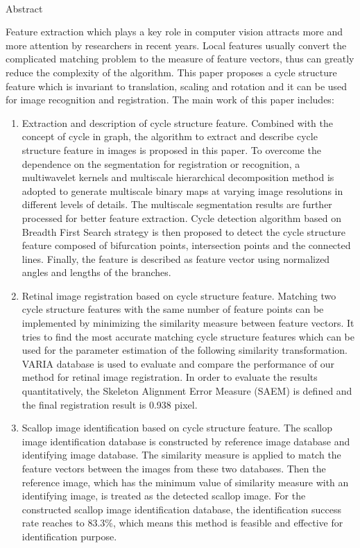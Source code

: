 \newpage
\begin{center}
  {\sanhao[1.5]\heiti\oucetitle\\\vskip7pt Abstract}
\end{center}
{\normalsize\songti

Feature extraction which plays a key role in computer vision attracts more and more attention by researchers in recent years. Local features usually convert the complicated matching problem to the measure of feature vectors, thus can greatly reduce the complexity of the algorithm. This paper proposes a cycle structure feature which is invariant to translation, scaling and rotation and it can be used for image recognition and registration. The main work of this paper includes:

\begin{enumerate}
\item Extraction and description of cycle structure feature. Combined with the concept of cycle in graph, the algorithm to extract and describe cycle structure feature in images is proposed in this paper. To overcome the dependence on the segmentation for registration or recognition, a multiwavelet kernels and multiscale hierarchical decomposition method is adopted to generate multiscale binary maps at varying image resolutions in different levels of details. The multiscale segmentation results are further processed for better feature extraction. Cycle detection algorithm based on Breadth First Search strategy is then proposed to detect the cycle structure feature composed of bifurcation points, intersection points and the connected lines. Finally, the feature is described as feature vector using normalized angles and lengths of the branches. 
\item Retinal image registration based on cycle structure feature. Matching two cycle structure features with the same number of feature points can be implemented by minimizing the similarity measure between feature vectors. It tries to find the most accurate matching cycle structure features which can be used for the parameter estimation of the following similarity transformation. VARIA database is used to evaluate and compare the performance of our method for retinal image registration. In order to evaluate the results quantitatively, the Skeleton Alignment Error Measure (SAEM) is defined and the final registration result is 0.938 pixel.
\item Scallop image identification based on cycle structure feature. The scallop image identification database is constructed by reference image database and identifying image database. The similarity measure is applied to match the feature vectors between the images from these two databases. Then the reference image, which has the minimum value of similarity measure with an identifying image, is treated as the detected scallop image. For the constructed scallop image identification database, the identification success rate reaches to 83.3\%, which means this method is feasible and effective for identification purpose.
\end{enumerate}  
	
}
